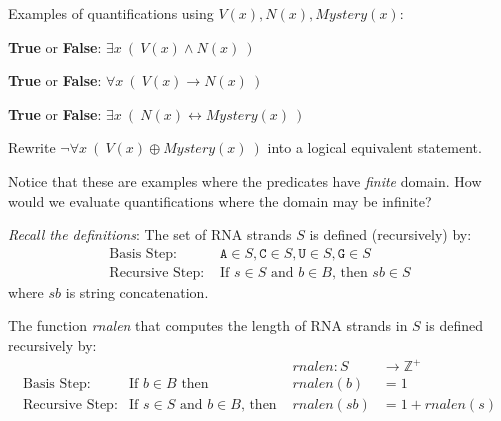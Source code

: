 \documentclass[12pt, oneside]{article}
\newcommand{\A}[0]{\texttt{A}}
\newcommand{\C}[0]{\texttt{C}}
\newcommand{\G}[0]{\texttt{G}}
\newcommand{\U}[0]{\texttt{U}}
\begin{document}
Examples of quantifications using $V(x), N(x), Mystery(x)$:

{\bf True} or {\bf False}: $\exists x~ (~V(x) \land N(x)~)$

\vfill

{\bf True} or {\bf False}: $\forall x~ (~V(x) \to N(x)~)$

\vfill

{\bf True} or {\bf False}: $\exists x~ (~N(x) \leftrightarrow Mystery(x)~)$

\vfill

Rewrite $\lnot \forall x~(~V(x) \oplus Mystery(x)~)$ into a logical equivalent statement.

\vspace{50pt}


Notice that these are examples where the predicates have {\it finite} domain.
How would we evaluate quantifications where the domain may be infinite?

\vfill

 \vfill
\newpage


{\it Recall the definitions}: The set of RNA strands $S$ is defined (recursively) by:
\[
\begin{array}{ll}
\textrm{Basis Step: } & \A \in S, \C \in S, \U \in S, \G \in S \\
\textrm{Recursive Step: } & \textrm{If } s \in S\textrm{ and }b \in B \textrm{, then }sb \in S
\end{array}
\]
where $sb$ is string concatenation.

The function \textit{rnalen} that computes the length of RNA strands in $S$ is defined recursively by:
\[
\begin{array}{llll}
& & \textit{rnalen} : S & \to \mathbb{Z}^+ \\
\textrm{Basis Step:} & \textrm{If } b \in B\textrm{ then } & \textit{rnalen}(b) & = 1 \\
\textrm{Recursive Step:} & \textrm{If } s \in S\textrm{ and }b \in B\textrm{, then  } & \textit{rnalen}(sb) & = 1 + \textit{rnalen}(s)
\end{array}
\]
\end{document}
